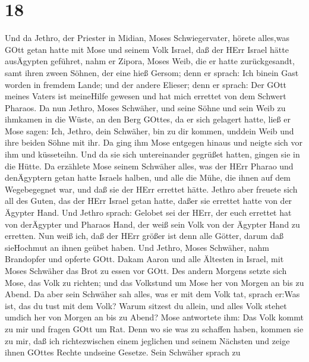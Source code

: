 \hypertarget{section-17}{%
\section{18}\label{section-17}}

 Und da Jethro, der Priester in Midian, Moses
Schwiegervater, hörete alles,was GOtt getan hatte mit Mose und seinem
Volk Israel, daß der HErr Israel hätte ausÄgypten geführet, 
nahm er Zipora, Moses Weib, die er hatte zurückgesandt, 
samt ihren zween Söhnen, der eine hieß Gersom; denn er sprach: Ich
binein Gast worden in fremdem Lande;  und der andere
Elieser; denn er sprach: Der GOtt meines Vaters ist meineHilfe gewesen
und hat mich errettet von dem Schwert Pharaos.  Da nun
Jethro, Moses Schwäher, und seine Söhne und sein Weib zu ihmkamen in die
Wüste, an den Berg GOttes, da er sich gelagert hatte,  ließ
er Mose sagen: Ich, Jethro, dein Schwäher, bin zu dir kommen, unddein
Weib und ihre beiden Söhne mit ihr.  Da ging ihm Mose
entgegen hinaus und neigte sich vor ihm und küsseteihn. Und da sie sich
untereinander gegrüßet hatten, gingen sie in die Hütte.  Da
erzählete Mose seinem Schwäher alles, was der HErr Pharao und
denÄgyptern getan hatte Israels halben, und alle die Mühe, die ihnen auf
dem Wegebegegnet war, und daß sie der HErr errettet hätte. 
Jethro aber freuete sich all des Guten, das der HErr Israel getan hatte,
daßer sie errettet hatte von der Ägypter Hand.  Und Jethro
sprach: Gelobet sei der HErr, der euch errettet hat von derÄgypter und
Pharaos Hand, der weiß sein Volk von der Ägypter Hand zu erretten.
 Nun weiß ich, daß der HErr größer ist denn alle Götter,
darum daß sieHochmut an ihnen geübet haben.  Und Jethro,
Moses Schwäher, nahm Brandopfer und opferte GOtt. Dakam Aaron und alle
Ältesten in Israel, mit Moses Schwäher das Brot zu essen vor GOtt.
 Des andern Morgens setzte sich Mose, das Volk zu richten;
und das Volkstund um Mose her von Morgen an bis zu Abend. 
Da aber sein Schwäher sah alles, was er mit dem Volk tat, sprach er:Was
ist, das du tust mit dem Volk? Warum sitzest du allein, und alles Volk
stehet umdich her von Morgen an bis zu Abend?  Mose
antwortete ihm: Das Volk kommt zu mir und fragen GOtt um Rat.
 Denn wo sie was zu schaffen haben, kommen sie zu mir, daß
ich richtezwischen einem jeglichen und seinem Nächsten und zeige ihnen
GOttes Rechte undseine Gesetze.  Sein Schwäher sprach zu
